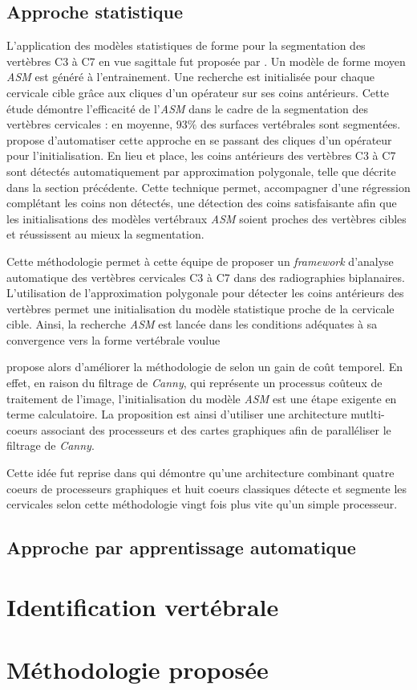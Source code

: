     \subsection{Approche statistique}

        L'application des modèles statistiques de forme pour la segmentation des vertèbres C3 à C7 en vue sagittale fut proposée par \cite{Benjelloun2010}. Un modèle de forme moyen {\itshape ASM} est généré à l'entrainement. Une recherche est initialisée pour chaque cervicale cible grâce aux cliques d'un opérateur sur ses coins antérieurs. Cette étude démontre l'efficacité de l'{\itshape ASM} dans le cadre de la segmentation des vertèbres cervicales : en moyenne, $93\%$ des surfaces vertébrales sont segmentées.
        \\

        \cite{Lecron2010} propose d'automatiser cette approche en se passant des cliques d'un opérateur pour l'initialisation. En lieu et place, les coins antérieurs des vertèbres C3 à C7 sont détectés automatiquement par approximation polygonale, telle que décrite dans la section précédente. Cette technique permet, accompagner d'une régression complétant les coins non détectés, une détection des coins satisfaisante afin que les initialisations des modèles vertébraux {\itshape ASM} soient proches des vertèbres cibles et réussissent au mieux la segmentation.

        Cette méthodologie permet à cette équipe de proposer un {\itshape framework} d'analyse automatique des vertèbres cervicales C3 à C7 dans des radiographies biplanaires. L'utilisation de l'approximation polygonale pour détecter les coins antérieurs des vertèbres permet une initialisation du modèle statistique proche de la cervicale cible. Ainsi, la recherche {\itshape ASM} est lancée dans les conditions adéquates à sa convergence vers la forme vertébrale voulue

        \cite{Mahmoudi2010} propose alors d'améliorer la méthodologie de \cite{Lecron2010} selon un gain de coût temporel. En effet, en raison du filtrage de {\itshape Canny}, qui représente un processus coûteux de traitement de l'image, l'initialisation du modèle {\itshape ASM} est une étape exigente en terme calculatoire. La proposition est ainsi d'utiliser une architecture mutlti-coeurs associant des processeurs et des cartes graphiques afin de paralléliser le filtrage de {\itshape Canny}.

        Cette idée fut reprise dans \cite{Lecron2011} qui démontre qu'une architecture combinant quatre coeurs de processeurs graphiques et huit coeurs classiques détecte et segmente les cervicales selon cette méthodologie vingt fois plus vite qu'un simple processeur.



    \subsection{Approche par apprentissage automatique}

\section{Identification vertébrale}

\section{Méthodologie proposée}

